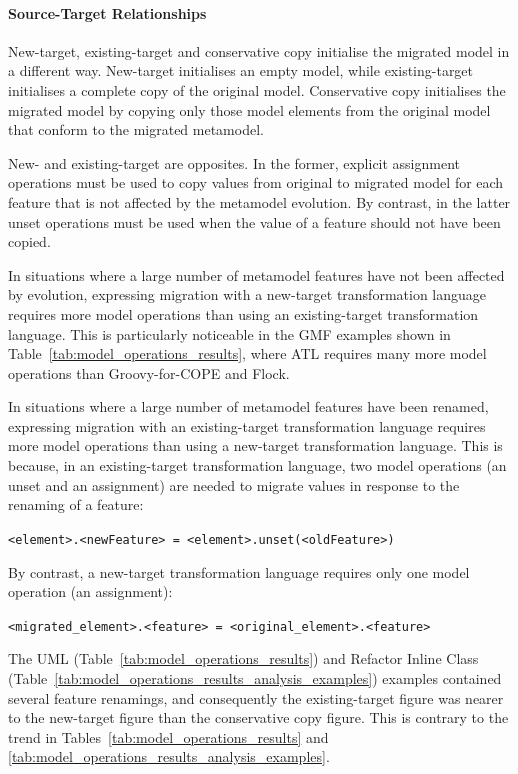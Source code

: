 \paragraph{Source-Target Relationships}
New-target, existing-target and conservative copy initialise the migrated model in a different way. New-target initialises an empty model, while existing-target initialises a complete copy of the original model. Conservative copy initialises the migrated model by copying only those model elements from the original model that conform to the migrated metamodel.

New- and existing-target are opposites. In the former, explicit assignment operations must be used to copy values from original to migrated model for each feature that is not affected by the metamodel evolution. By contrast, in the latter unset operations must be used when the value of a feature should not have been copied.

In situations where a large number of metamodel features have not been affected by evolution, expressing migration with a new-target transformation language requires more model operations than using an existing-target transformation language. This is particularly noticeable in the GMF examples shown in Table~\ref{tab:model_operations_results}, where ATL requires many more model operations than Groovy-for-COPE and Flock.

In situations where a large number of metamodel features have been renamed, expressing migration with an existing-target transformation language requires more model operations than using a new-target transformation language. This is because, in an existing-target transformation language, two model operations (an unset and an assignment) are needed to migrate values in response to the renaming of a feature:

\texttt{<element>.<newFeature> = <element>.unset(<oldFeature>)}

By contrast, a new-target transformation language requires only one model operation (an assignment):

\texttt{<migrated\_element>.<feature> = <original\_element>.<feature>}

The UML (Table~\ref{tab:model_operations_results}) and Refactor Inline Class (Table~\ref{tab:model_operations_results_analysis_examples}) examples contained several feature renamings, and consequently the existing-target figure was nearer to the new-target figure than the conservative copy figure. This is contrary to the trend in Tables~\ref{tab:model_operations_results} and \ref{tab:model_operations_results_analysis_examples}.

